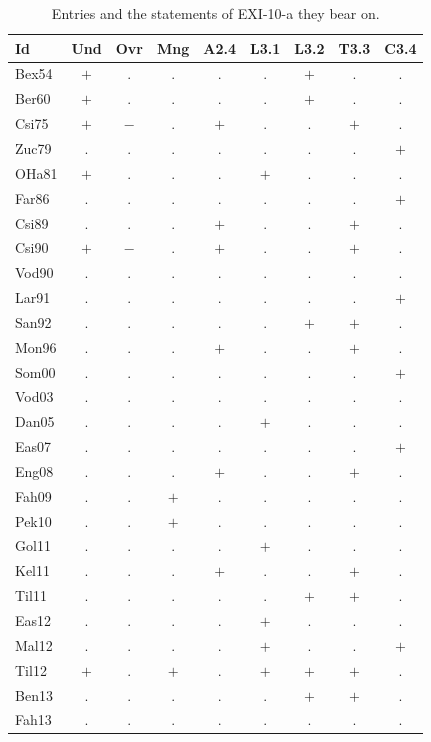 {\footnotesize\setlength{\tabcolsep}{4pt}
\begin{longtable}{@{}lcccccccc@{}}
\caption{Entries and the statements of EXI-10-a they bear on.}\label{tab:matrix}\\
\toprule
Id & Und & Ovr & Mng & A2.4 & L3.1 & L3.2 & T3.3 & C3.4 \\
\midrule\endhead
\bottomrule\endfoot
Bex54 & $+$ & . & . & . & . & $+$ & . & . \\
Ber60 & $+$ & . & . & . & . & $+$ & . & . \\
Csi75 & $+$ & $-$ & . & $+$ & . & . & $+$ & . \\
Zuc79 & . & . & . & . & . & . & . & $+$ \\
OHa81 & $+$ & . & . & . & $+$ & . & . & . \\
Far86 & . & . & . & . & . & . & . & $+$ \\
Csi89 & . & . & . & $+$ & . & . & $+$ & . \\
Csi90 & $+$ & $-$ & . & $+$ & . & . & $+$ & . \\
Vod90 & . & . & . & . & . & . & . & . \\
Lar91 & . & . & . & . & . & . & . & $+$ \\
San92 & . & . & . & . & . & $+$ & $+$ & . \\
Mon96 & . & . & . & $+$ & . & . & $+$ & . \\
Som00 & . & . & . & . & . & . & . & $+$ \\
Vod03 & . & . & . & . & . & . & . & . \\
Dan05 & . & . & . & . & $+$ & . & . & . \\
Eas07 & . & . & . & . & . & . & . & $+$ \\
Eng08 & . & . & . & $+$ & . & . & $+$ & . \\
Fah09 & . & . & $+$ & . & . & . & . & . \\
Pek10 & . & . & $+$ & . & . & . & . & . \\
Gol11 & . & . & . & . & $+$ & . & . & . \\
Kel11 & . & . & . & $+$ & . & . & $+$ & . \\
Til11 & . & . & . & . & . & $+$ & $+$ & . \\
Eas12 & . & . & . & . & $+$ & . & . & . \\
Mal12 & . & . & . & . & $+$ & . & . & $+$ \\
Til12 & $+$ & . & $+$ & . & $+$ & $+$ & $+$ & . \\
Ben13 & . & . & . & . & . & $+$ & $+$ & . \\
Fah13 & . & . & . & . & . & . & . & . \\

\end{longtable}}
